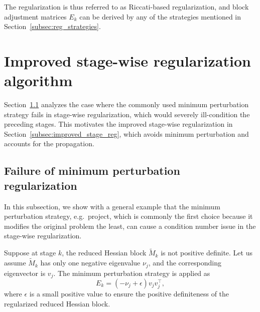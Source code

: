 \documentclass[class=scrbook, crop=false]{standalone}
\begin{document}
The regularization is thus referred to as Riccati-based regularization,
and block adjustment matrices $E_k$ can be derived by any of the strategies mentioned in Section~\ref{subsec:reg_strategies}.

\section{Improved stage-wise regularization algorithm}
\label{sec:fail_minimal_perturbation}
Section~\ref{subsec:min_perturbation_failure} analyzes the case
where the commonly used minimum perturbation strategy fails in stage-wise regularization,
which would severely ill-condition the preceding stages.
This motivates the improved stage-wise regularization in Section~\ref{subsec:improved_stage_reg},
which avoids minimum perturbation and accounts for the propagation.

\subsection{Failure of minimum perturbation regularization}
\label{subsec:min_perturbation_failure}
In this subsection, we show with a general example that the minimum perturbation strategy, e.g.\ project,
which is commonly the first choice because it modifies the original problem the least,
can cause a condition number issue in the stage-wise regularization.

Suppose at stage $k$, the reduced Hessian block $\tilde{M}_k$ is not positive definite.
Let us assume $\tilde{M}_k$ has only one negative eigenvalue $\nu_j$, and the corresponding eigenvector is $v_j$.
The minimum perturbation strategy is applied as
\begin{equation}
    E_k = (-\nu_{j}+\epsilon) v_j v_j^\top,
\end{equation}
where $\epsilon$ is a small positive value to ensure the positive definiteness of the regularized reduced Hessian block. 
\end{document}
